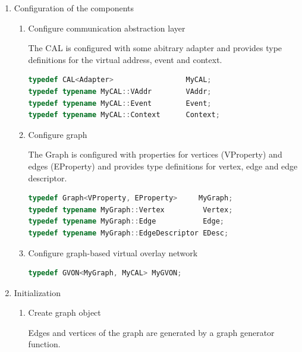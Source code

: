 \begin{enumerate}

\item Configuration of the components
\begin{enumerate}

\item Configure communication abstraction layer
  
  The CAL is configured with some abitrary adapter and provides type
  definitions for the virtual address, event and
  context.

  \begin{lstlisting}[language=C++, label=lst:conf_cal]
typedef CAL<Adapter>                 MyCAL;
typedef typename MyCAL::VAddr        VAddr;
typedef typename MyCAL::Event        Event;
typedef typename MyCAL::Context      Context;
  \end{lstlisting}

\item Configure graph

  The Graph is configured with properties for vertices (VProperty) and
  edges (EProperty) and provides type definitions for vertex, edge and
  edge descriptor. 

  \begin{lstlisting}[language=C++, label=lst:conf_graph]
typedef Graph<VProperty, EProperty>     MyGraph;
typedef typename MyGraph::Vertex         Vertex;
typedef typename MyGraph::Edge           Edge;
typedef typename MyGraph::EdgeDescriptor EDesc;
  \end{lstlisting}



\item Configure graph-based virtual overlay network

  \begin{lstlisting}[language=C++, label=lst:conf_gvon, style=types]
typedef GVON<MyGraph, MyCAL> MyGVON;
  \end{lstlisting}

\end{enumerate}

\item Initialization
  \begin{enumerate}
  
  \item Create graph object

    Edges and vertices of the graph are generated by a graph generator function.


\end{enumerate}
\end{enumerate}
